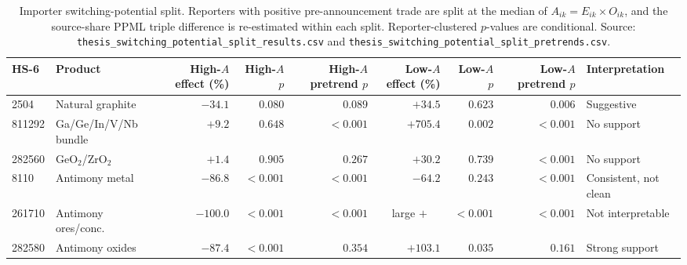 \begin{table}[H]
\centering
\caption{Importer switching-potential split. Reporters with positive
pre-announcement trade are split at the median of $A_{ik}=E_{ik}\times O_{ik}$,
and the source-share PPML triple difference is re-estimated within each split.
Reporter-clustered $p$-values are conditional. Source:
\texttt{thesis\_switching\_potential\_split\_results.csv} and
\texttt{thesis\_switching\_potential\_split\_pretrends.csv}.}
\label{tab:switching}
\scriptsize
\begin{tabular}{llrrrrrrl}
\toprule
HS-6 & Product & \shortstack{High-$A$\\effect (\%)} & \shortstack{High-$A$\\$p$} & \shortstack{High-$A$\\pretrend $p$} & \shortstack{Low-$A$\\effect (\%)} & \shortstack{Low-$A$\\$p$} & \shortstack{Low-$A$\\pretrend $p$} & Interpretation \\
\midrule
2504   & Natural graphite           & $-34.1$ & $0.080$  & $0.089$ & $+34.5$ & $0.623$ & $0.006$ & Suggestive \\
811292 & Ga/Ge/In/V/Nb bundle      & $+9.2$  & $0.648$  & $<0.001$ & $+705.4$ & $0.002$ & $<0.001$ & No support \\
282560 & GeO$_2$/ZrO$_2$           & $+1.4$  & $0.905$  & $0.267$ & $+30.2$ & $0.739$ & $<0.001$ & No support \\
8110   & Antimony metal             & $-86.8$ & $<0.001$ & $<0.001$ & $-64.2$ & $0.243$ & $<0.001$ & Consistent, not clean \\
261710 & Antimony ores/conc.        & $-100.0$ & $<0.001$ & $<0.001$ & \multicolumn{1}{c}{large $+$} & $<0.001$ & $<0.001$ & Not interpretable \\
282580 & Antimony oxides            & $-87.4$ & $<0.001$ & $0.354$ & $+103.1$ & $0.035$ & $0.161$ & Strong support \\
\bottomrule
\end{tabular}
\end{table}
